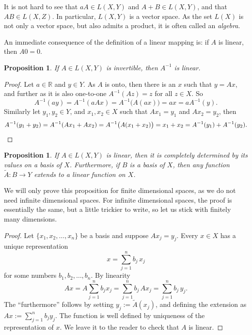 \documentclass[12pt]{book}
\newcommand{\R}{{\mathbb{R}}}
\newcommand{\myindex}[1]{#1\index{#1}}
\theoremstyle{plain}
\newtheorem{prop}[thm]{Proposition}
\theoremstyle{remark}
\theoremstyle{definition}
\theoremstyle{exercise}
\theoremstyle{example}
\begin{document}
It is not hard to see that $aA \in L(X,Y)$
and $A+B \in L(X,Y)$, and that $AB \in L(X,Z)$.
In particular, $L(X,Y)$ is a vector space.
As the set $L(X)$ is not only a vector space, but also
admits a product, it is often called an \emph{\myindex{algebra}}.

An immediate consequence of the definition of a linear mapping is: if
$A$ is linear, then $A0 = 0$.

\begin{prop}
If $A \in L(X,Y)$ is invertible, then $A^{-1}$ is linear.
\end{prop}

\begin{proof}
Let $a \in \R$ and $y \in Y$.  As $A$ is onto, then there is an 
$x$ such that $y = Ax$, and further as it is also one-to-one
$A^{-1}(Az) = z$ for all $z \in X$.  So
\begin{equation*}
A^{-1}(ay)
=
A^{-1}(aAx)
=
A^{-1}\bigl(A(ax)\bigr)
= ax
= aA^{-1}(y).
\end{equation*}
Similarly let $y_1,y_2 \in Y$, and $x_1, x_2 \in X$ such that
$Ax_1 = y_1$ and 
$Ax_2 = y_2$, then
\begin{equation*}
A^{-1}(y_1+y_2)
=
A^{-1}(Ax_1+Ax_2)
=
A^{-1}\bigl(A(x_1+x_2)\bigr)
= x_1+x_2
= A^{-1}(y_1) + A^{-1}(y_2). \qedhere
\end{equation*}
\end{proof}

\begin{prop} \label{mv:lindefonbasis}
If $A \in L(X,Y)$ is linear, then it is completely determined
by its values on a basis of $X$.
Furthermore, if $B$ is a basis of $X$,
then any function $\widetilde{A} \colon B \to Y$ extends to a linear
function on $X$.
\end{prop}

We will only prove this proposition for finite dimensional spaces, as we do
not need infinite dimensional spaces.
For infinite dimensional spaces, the proof is essentially the same, but a
little trickier to write, so let us stick with finitely many dimensions.

\begin{proof}
Let $\{ x_1, x_2, \ldots, x_n \}$ be a basis and suppose 
$A x_j = y_j$.  Every $x \in X$ has a unique representation
\begin{equation*}
x = \sum_{j=1}^n b_j \, x_j
\end{equation*}
for some numbers $b_1,b_2,\ldots,b_n$.  By linearity
\begin{equation*}
Ax = 
A\sum_{j=1}^n b_j x_j
=
\sum_{j=1}^n b_j \, Ax_j
=
\sum_{j=1}^n b_j \, y_j .
\end{equation*}
The ``furthermore'' follows by setting $y_j := \widetilde{A}(x_j)$,
and defining the extension as
$Ax := \sum_{j=1}^n b_j y_j$.  The function is well defined by
uniqueness of the representation of $x$.
We leave it to the reader to check that $A$ is linear.
\end{proof}
\end{document}
